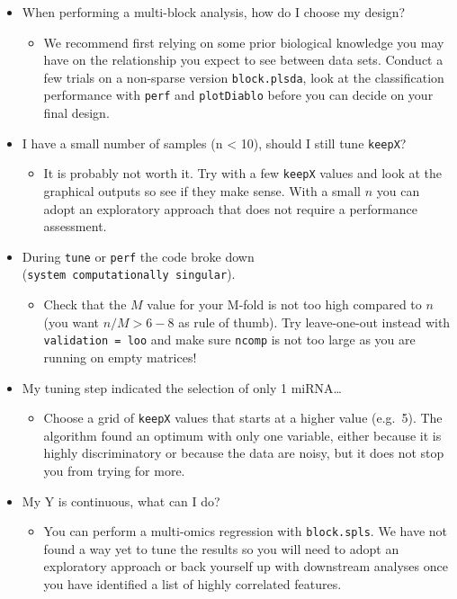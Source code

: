 \documentclass[]{book}
\providecommand{\tightlist}{%
  \setlength{\itemsep}{0pt}\setlength{\parskip}{0pt}}
\begin{document}
\begin{itemize}
\tightlist
\item
  When performing a multi-block analysis, how do I choose my design?

  \begin{itemize}
  \tightlist
  \item
    We recommend first relying on some prior biological knowledge you may have on the relationship you expect to see between data sets. Conduct a few trials on a non-sparse version \texttt{block.plsda}, look at the classification performance with \texttt{perf} and \texttt{plotDiablo} before you can decide on your final design.
  \end{itemize}
\item
  I have a small number of samples (n \textless{} 10), should I still tune \texttt{keepX}?

  \begin{itemize}
  \tightlist
  \item
    It is probably not worth it. Try with a few \texttt{keepX} values and look at the graphical outputs so see if they make sense. With a small \(n\) you can adopt an exploratory approach that does not require a performance assessment.
  \end{itemize}
\item
  During \texttt{tune} or \texttt{perf} the code broke down (\texttt{system\ computationally\ singular}).

  \begin{itemize}
  \tightlist
  \item
    Check that the \(M\) value for your M-fold is not too high compared to \(n\) (you want \(n/M > 6 - 8\) as rule of thumb). Try leave-one-out instead with \texttt{validation\ =\ \textquotesingle{}loo\textquotesingle{}} and make sure \texttt{ncomp} is not too large as you are running on empty matrices!
  \end{itemize}
\item
  My tuning step indicated the selection of only 1 miRNA\ldots{}

  \begin{itemize}
  \tightlist
  \item
    Choose a grid of \texttt{keepX} values that starts at a higher value (e.g.~5). The algorithm found an optimum with only one variable, either because it is highly discriminatory or because the data are noisy, but it does not stop you from trying for more.
  \end{itemize}
\item
  My Y is continuous, what can I do?

  \begin{itemize}
  \tightlist
  \item
    You can perform a multi-omics regression with \texttt{block.spls}. We have not found a way yet to tune the results so you will need to adopt an exploratory approach or back yourself up with downstream analyses once you have identified a list of highly correlated features.
  \end{itemize}
\end{itemize}
\end{document}
